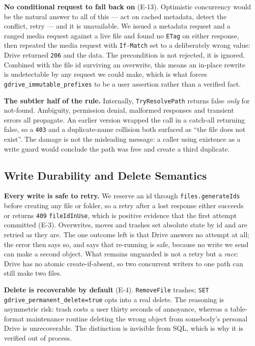 \documentclass[sigconf, nonacm]{acmart}
\newcommand{\expref}[1]{\textsf{E-#1}}
\begin{document}
\textbf{No conditional request to fall back on} (\expref{13}). Optimistic
concurrency would be the natural answer to all of this --- act on cached
metadata, detect the conflict, retry --- and it is unavailable. We issued a
metadata request and a ranged media request against a live file and found no
\texttt{ETag} on either response, then repeated the media request with
\texttt{If-Match} set to a deliberately wrong value: Drive returned
\texttt{206} and the data. The precondition is not rejected, it is ignored.
Combined with the file id surviving an overwrite, this means an in-place
rewrite is undetectable by any request we could make, which is what forces
\texttt{gdrive\_immutable\_prefixes} to be a user assertion rather than a
verified fact.

\textbf{The subtler half of the rule.} Internally, \texttt{TryResolvePath}
returns false \emph{only} for not-found. Ambiguity, permission denial,
malformed responses and transient errors all propagate. An earlier version
wrapped the call in a catch-all returning false, so a \texttt{403} and a
duplicate-name collision both surfaced as ``the file does not exist''. The
damage is not the misleading message: a caller using existence as a write
guard would conclude the path was free and create a third duplicate.

\subsection{Write Durability and Delete Semantics}

\textbf{Every write is safe to retry.} We reserve an id through
\texttt{files.generateIds} before creating any file or folder, so a retry
after a lost response either succeeds or returns \texttt{409}
\texttt{fileIdInUse}, which is positive evidence that the first attempt
committed (\expref{3}). Overwrites, moves and trashes set absolute state by id
and are retried as they are. The one outcome left is that Drive answers no
attempt at all; the error then says so, and says that re-running is safe,
because no write we send can make a second object. What remains unguarded is
not a retry but a \emph{race}: Drive has no atomic create-if-absent, so two
concurrent writers to one path can still make two files.

\textbf{Delete is recoverable by default} (\expref{4}). \texttt{RemoveFile}
trashes; \texttt{SET gdrive\_permanent\_delete=true} opts into a real delete.
The reasoning is asymmetric risk: trash costs a user thirty seconds of
annoyance, whereas a table-format maintenance routine deleting the wrong
object from somebody's personal Drive is unrecoverable. The distinction is
invisible from SQL, which is why it is verified out of process.
\end{document}
